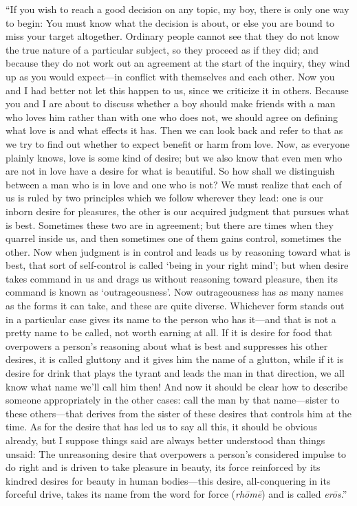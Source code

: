 “If you wish to reach a good decision on any topic, my boy, there is 
only one way to begin: You must know what the decision is about,
or else you are bound to miss your target altogether. Ordinary people
cannot see that they do not know the true nature of a particular
subject, so they proceed as if they did; and because they do not work
out an agreement at the start of the inquiry, they wind up as you would
expect---in conflict with themselves and each other. Now you and I had
better not let this happen to us, since we criticize it in others.
Because you and I are about to discuss whether a boy should make friends
with a man who loves him rather than with one who does not, we
should agree on defining what love is and what effects it has. Then we
can look back and refer to that as we try to find out whether to expect
benefit or harm from love. Now, as everyone plainly knows, love is some
kind of desire; but we also know that even men who are not in love have
a desire for what is beautiful. So how shall we distinguish between a
man who is in love and one who is not? We must realize that each of us
is ruled by two principles which we follow wherever they lead: one is
our inborn desire for pleasures, the other is our acquired judgment that
pursues what is best. Sometimes these two are in agreement; but
there are times when they quarrel inside us, and then sometimes one of
them gains control, sometimes the other. Now when judgment is in control
and leads us by reasoning toward what is best, that sort of self-control
is called ‘being in your right mind’; but when desire 
takes command in us and drags us without reasoning toward pleasure, then
its command is known as
‘outrageousness’. 
Now outrageousness has as many names as the forms it can take, and these are
quite diverse.
Whichever form stands out in a particular case gives its name to the
person who has it---and that is not a pretty name to be called, not
worth earning at all. If it is desire for food that overpowers a
person’s reasoning about what is best and suppresses his other desires,
it is called gluttony and it gives him the name of a glutton,
while if it is desire for drink that plays the tyrant and leads the man
in that direction, we all know what name we’ll call him then! And now it
should be clear how to describe someone appropriately in the other
cases: call the man by that name---sister to these others---that derives
from the sister of these desires that controls him at the time. As for
the desire that has led us to say all this, it should be obvious
already, but I suppose things said are always better understood than
things unsaid: The unreasoning desire that overpowers a person’s
considered impulse to do right and is driven to take pleasure in beauty, 
its force reinforced by its kindred desires for beauty in human
bodies---this desire, all-conquering in its forceful drive, takes its
name from the word for force ({\em rhōmē}) and is called {\em erōs}.”

